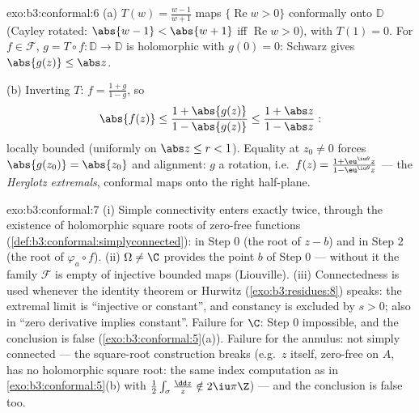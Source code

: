 \begin{solution}{exo:b3:conformal:6}
(a) $T(w) = \frac{w - 1}{w + 1}$ maps $\{\operatorname{Re}w >
0\}$ conformally onto $\mathbb D$ (Cayley rotated: $\abs{w -
1} < \abs{w + 1}$ iff $\operatorname{Re}w > 0$), with $T(1) =
0$. For $f \in \mathcal F$, $g = T\circ f\colon \mathbb D \to
\mathbb D$ is holomorphic with $g(0) = 0$: Schwarz gives
$\abs{g(z)} \leq \abs z$.

(b) Inverting $T$: $f = \frac{1 + g}{1 - g}$, so
\[
\abs{f(z)} \leq \frac{1 + \abs{g(z)}}{1 - \abs{g(z)}}
\leq \frac{1 + \abs z}{1 - \abs z} :
\]
locally bounded (uniformly on $\abs z \leq r < 1$). Equality
at $z_0 \neq 0$ forces $\abs{g(z_0)} = \abs{z_0}$ and
alignment: $g$ a rotation, i.e.\ $f(z) = \frac{1 +
\eu^{\iu\theta}z}{1 - \eu^{\iu\theta}z}$ --- the
\emph{Herglotz extremals}, conformal maps onto the right
half-plane.
\end{solution}

\begin{solution}{exo:b3:conformal:7}
(i) Simple connectivity enters exactly twice, through the
existence of holomorphic square roots of zero-free functions
(\cref{def:b3:conformal:simplyconnected}): in Step 0 (the root
of $z - b$) and in Step 2 (the root of $\varphi_a\circ f$).
(ii) $\Omega \neq \C$ provides the point $b$ of Step 0 ---
without it the family $\mathcal F$ is empty of injective
bounded maps (Liouville). (iii) Connectedness is used whenever
the identity theorem or Hurwitz (\cref{exo:b3:residues:8})
speaks: the extremal limit is ``injective or constant'', and
constancy is excluded by $s > 0$; also in ``zero derivative
implies constant''. Failure for $\C$: Step 0 impossible, and
the conclusion is false (\cref{exo:b3:conformal:5}(a)).
Failure for the annulus: not simply connected --- the
square-root construction breaks (e.g.\ $z$ itself, zero-free
on $A$, has no holomorphic square root: the same index
computation as in \cref{exo:b3:conformal:5}(b) with
$\frac12\int_\sigma\frac{\dd z}z \notin 2\iu\pi\Z$) --- and
the conclusion is false too.
\end{solution}

